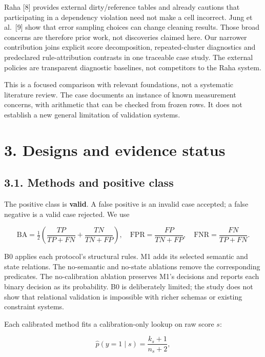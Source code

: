 Raha {[}8{]} provides external dirty/reference tables and already
cautions that participating in a dependency violation need not make a
cell incorrect. Jung et al.~{[}9{]} show that error sampling choices can
change cleaning results. Those broad concerns are therefore prior work,
not discoveries claimed here. Our narrower contribution joins explicit
score decomposition, repeated-cluster diagnostics and predeclared
rule-attribution contrasts in one traceable case study. The external
policies are transparent diagnostic baselines, not competitors to the
Raha system.

This is a focused comparison with relevant foundations, not a systematic
literature review. The case documents an instance of known measurement
concerns, with arithmetic that can be checked from frozen rows. It does
not establish a new general limitation of validation systems.

\hypertarget{designs-and-evidence-status}{%
\section{3. Designs and evidence
status}\label{designs-and-evidence-status}}

\hypertarget{methods-and-positive-class}{%
\subsection{3.1. Methods and positive
class}\label{methods-and-positive-class}}

The positive class is \textbf{valid}. A false positive is an invalid
case accepted; a false negative is a valid case rejected. We use

\[
\mathrm{BA}=\tfrac12\left(\frac{TP}{TP+FN}+\frac{TN}{TN+FP}\right),\quad
\mathrm{FPR}=\frac{FP}{TN+FP},\quad \mathrm{FNR}=\frac{FN}{TP+FN}.
\]

B0 applies each protocol's structural rules. M1 adds its selected
semantic and state relations. The no-semantic and no-state ablations
remove the corresponding predicates. The no-calibration ablation
preserves M1's decisions and reports each binary decision as its
probability. B0 is deliberately limited; the study does not show that
relational validation is impossible with richer schemas or existing
constraint systems.

Each calibrated method fits a calibration-only lookup on raw score
\(s\):

\[
\widehat p(y=1\mid s)=\frac{k_s+1}{n_s+2},
\]

